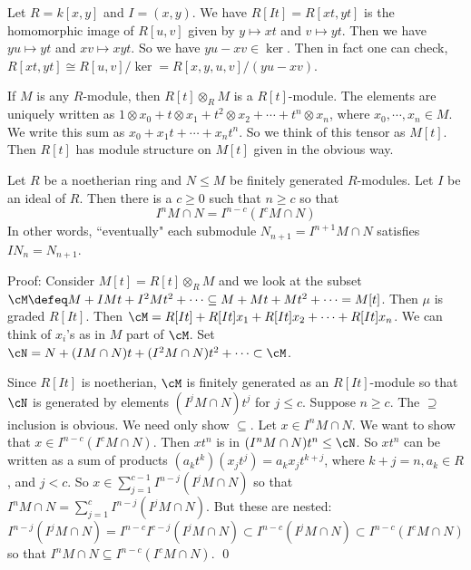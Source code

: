 \begin{ex}
Let $R=k[x,y]$ and $I=(x,y)$. We have $R[It]=R[xt,yt]$ is the homomorphic image of $R[u,v]$ given by $y \mapsto xt$ and $v \mapsto yt$. Then we have $yu \mapsto yt$ and $xv \mapsto xyt$. So we have $yu-xv \in \ker$. Then in fact one can check, $R[xt,yt] \cong R[u,v]/\ker = R[x,y,u,v]/(yu-xv)$. 
\end{ex}

\begin{rem}
If $M$ is any $R$-module, then $R[t] \otimes_R M$ is a $R[t]$-module. The elements are uniquely written as $1 \otimes x_0+t\otimes x_1+t^2 \otimes x_2+ \cdots + t^n \otimes x_n$, where $x_0,\cdots,x_n \in M$. We write this sum as $x_0+x_1t+\cdots+x_nt^n$. So we think of this tensor as $M[t]$. Then $R[t]$ has module structure on $M[t]$ given in the obvious way. 
\end{rem}

\begin{lem}
Let $R$ be a noetherian ring and $N \leq M$ be finitely generated $R$-modules. Let $I$ be an ideal of $R$. Then there is a $c \geq 0$ such that $n \geq c$ so that 
\[
I^nM \cap N = I^{n-c}(I^cM \cap N)
\]
In other words, ``eventually" each submodule $N_{n+1}=I^{n+1}M \cap N$ satisfies $IN_n=N_{n+1}$. 
\end{lem}

\noindent Proof: Consider $M[t]=R[t] \otimes_R M$ and we look at the subset $\cM \defeq M+IMt+I^2Mt^2+\cdots \subseteq M+Mt+Mt^2+\cdots=M[t]$. Then $\mu$ is graded $R[It]$. Then $\cM=R[It]+R[It]x_1+R[It]x_2+\cdots+R[It]x_n$. We can think of $x_i$'s as in $M$ part of $\cM$. Set $\cN=N+(IM \cap N)t+(I^2M \cap N)t^2+\cdots \subset \cM$. 

Since $R[It]$ is noetherian, $\cM$ is finitely generated as an $R[It]$-module so that $\cN$ is generated by elements $(I^jM \cap N)t^j$ for $j \leq c$. Suppose $n \geq c$. The $\supseteq$ inclusion is obvious. We need only show $\subseteq$. Let $x \in I^nM \cap N$. We want to show that $x \in I^{n-c}(I^cM \cap N)$. Then $xt^n$ is in $(I^nM \cap N)t^n \leq \cN$. So $xt^n$ can be written as a sum of products $(a_kt^k)(x_jt^j)=a_kx_jt^{k+j}$, where $k+j=n, a_k \in R$, and $j<c$. So $x \in \sum_{j=1}^{c-1} I^{n-j}(I^jM \cap N)$ so that $I^nM \cap N=\sum_{j=1}^c I^{n-j}(I^jM \cap N)$. But these are nested:
\[
I^{n-j}(I^jM \cap N)=I^{n-c}I^{c-j}(I^jM \cap N) \subset I^{n-c}(I^jM \cap N)\subset I^{n-c}(I^c M \cap N)
\]
so that $I^nM \cap N \subseteq I^{n-c}(I^cM \cap N)$. \qed \\

